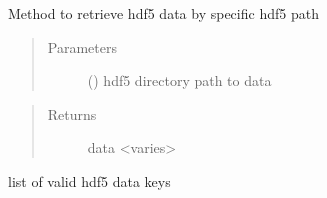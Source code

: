 \documentclass[letterpaper,10pt,english]{sphinxmanual}
\begin{document}
\begin{fulllineitems}

\begin{fulllineitems}
\label{\detokenize{index:lb_colloids.Colloids.Colloid_output.Hdf5Reader.get_data_by_path}}
Method to retrieve hdf5 data by specific hdf5 path
\begin{quote}\begin{description}
\item[{Parameters}] \leavevmode
{} () \textendash{} hdf5 directory path to data

\end{description}\end{quote}
\begin{quote}\begin{description}
\item[{Returns}] \leavevmode
data \textless{}varies\textgreater{}

\end{description}\end{quote}

\end{fulllineitems}


\begin{fulllineitems}
\label{\detokenize{index:lb_colloids.Colloids.Colloid_output.Hdf5Reader.keys}}
 \textendash{} list of valid hdf5 data keys

\end{fulllineitems}


\end{fulllineitems}

\end{document}
